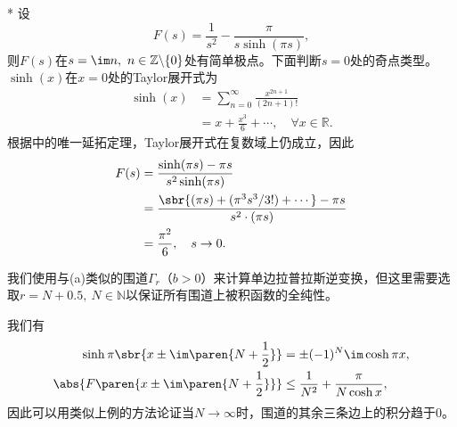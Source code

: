 \begin{example}*
    设
    \begin{equation}
        F(s)=\frac{1}{s^2}-\frac{\pi}{s\sinh(\pi s)},
    \end{equation}
    则$F(s)$在$s=\im n,\ n\in\mathbb{Z}\backslash\{0\}$处有简单极点。下面判断$s=0$处的奇点类型。$\sinh(x)$在$x=0$处的Taylor展开式为
    \begin{align}
        \sinh(x)&=\sum_{n=0}^{\infty}\frac{x^{2n+1}}{(2n+1)!}\nonumber\\
        &=x+\frac{x^3}{6}+\cdots,\quad \forall x\in\mathbb{R}.
    \end{align}
    根据中的唯一延拓定理，Taylor展开式在复数域上仍成立，因此
    \begin{align}
        F(s)&=\frac{\sinh(\pi s)-\pi s}{s^2\sinh(\pi s)}\nonumber\\
        &=\frac{\sbr{(\pi s)+(\pi^3 s^3/3!)+\cdots}-\pi s}{s^2\cdot(\pi s)}\nonumber\\
        &=\frac{\pi^2}{6},\quad s\to 0.
    \end{align}

    我们使用与(a)类似的围道$\Gamma_r$（$b>0$）来计算单边拉普拉斯逆变换，但这里需要选取$r=N+0.5,\ N\in\mathbb{N}$以保证所有围道上被积函数的全纯性。

    我们有
    \begin{align}
        \sinh\pi\sbr{x\pm\im\paren{N+\frac{1}{2}}}&=\pm(-1)^N\im\cosh\pi x,\\
        \abs{F\paren{x\pm\im\paren{N+\frac{1}{2}}}}&\leq\frac{1}{N^2}+\frac{\pi}{N\cosh x},
    \end{align}
    因此可以用类似上例的方法论证当$N\to\infty$时，围道的其余三条边上的积分趋于$0$。


\end{example}
